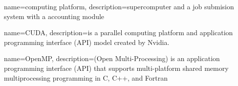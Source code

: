 
{
	name={computing platform},
	description={supercomputer and a job submision system with a accounting module}
}

{
	name={CUDA},
	description={is a parallel computing platform and application programming interface (API) model created by Nvidia.}
}

{
	name={OpenMP},
	description={(Open Multi-Processing) is an application programming interface (API) that supports multi-platform shared memory multiprocessing programming in C, C++, and Fortran}
}